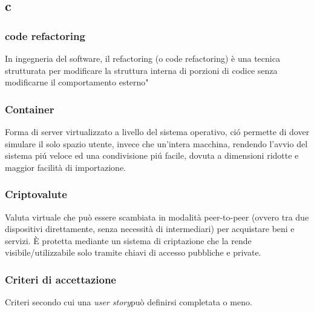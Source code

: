 \subsection*{\textbf{\hfill \Huge{c} \hfill}} 
\subsubsection*{code refactoring}
In ingegneria del software, il refactoring (o code refactoring) è una tecnica strutturata per modificare la struttura interna di porzioni di codice senza modificarne il comportamento esterno"
\subsubsection*{Container}
Forma di server virtualizzato a livello del sistema operativo, ció permette di dover simulare il solo spazio utente, invece che un’intera macchina, rendendo l’avvio del sistema piú veloce ed una condivisione piú facile, dovuta a dimensioni ridotte e maggior facilità di importazione.
\subsubsection*{Criptovalute}
Valuta virtuale che può essere scambiata in modalità peer-to-peer (ovvero tra due dispositivi direttamente, senza necessità di intermediari) per acquistare beni e servizi. È protetta mediante un sistema di criptazione che la rende visibile/utilizzabile solo tramite chiavi di accesso pubbliche e private.
\subsubsection*{Criteri di accettazione}
Criteri secondo cui una \textit{user story}\glo può definirsi completata o meno.
